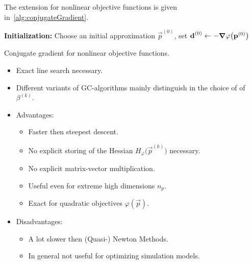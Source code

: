 			The extension for nonlinear objective functions is given in~\autoref{alg:conjugateGradient}.
			
			\begin{algorithm}  \DontPrintSemicolon
				\textbf{Initialization:} Choose an initial approximation \(\vec{p}^{(0)}\), set \( \boldsymbol{\mathrm{d}}^{(0)} \gets -\grad{\varphi}\big(\boldsymbol{\mathrm{p}}^{(0)}\big) \) \;
				
				\caption{Conjugate gradient for nonlinear objective functions.}
				\label{alg:conjugateGradient}
			\end{algorithm}
		
			\begin{itemize}
				\item Exact line search necessary.
				\item Different variants of GC-algorithms mainly distinguish in the choice of of \( \beta^{(k)} \).
				\item Advantages:
					\begin{itemize}
						\item Faster then steepest descent.
						\item No explicit storing of the Hessian \( H_\varphi\big(\vec{p}^{(k)}\big) \) necessary.
						\item No explicit matrix-vector multiplication.
						\item Useful even for extreme high dimensions \( n_p \).
						\item Exact for quadratic objectives \( \varphi(\vec{p}) \).
					\end{itemize}
				\item Disadvantages:
					\begin{itemize}
						\item A lot slower then (Quasi-) Newton Methods.
						\item In general not useful for optimizing simulation models.
					\end{itemize}
			\end{itemize}

